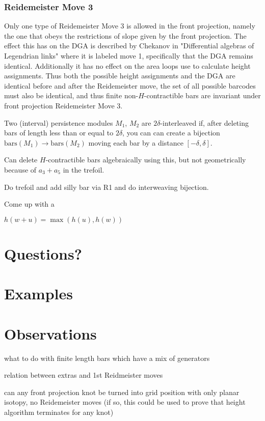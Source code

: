 \documentclass[11pt,oneside]{amsart}
\begin{document}
\subsubsection{Reidemeister Move 3} 

Only one type of Reidemeister Move 3 is allowed in the front projection, namely the one that obeys the restrictions of slope given by the front projection. The effect this has on the DGA is described by Chekanov in "Differential algebras of Legendrian links" where it is labeled move 1, specifically that the DGA remains identical. Additionally it has no effect on the area loops use to calculate height assignments. Thus both the possible height assignments and the DGA are identical before and after the Reidemeister move, the set of all possible barcodes must also be identical, and thus finite non-$H$-contractible bars are invariant under front projection Reidemeister Move 3.

\begin{definition}
    Two (interval) persistence modules $M_1$, $M_2$ are $2\delta$-interleaved if, after deleting bars of length less than or equal to $2\delta$, you can can create a bijection $\text{bars}(M_1)\rightarrow \text{bars}(M_2)$ moving each bar by a distance $[-\delta,\delta]$.
\end{definition}
Can delete $H$-contractible bars algebraically using this, but not geometrically because of $a_3 + a_5$ in the trefoil.

Do trefoil and add silly bar via R1 and do interweaving bijection.

Come up with a

$h(w+u)=\max(h(u),h(w))$
\section{Questions?}



\section{Examples}



\section{Observations}





what to do with finite length bars which have a mix of generators

relation between extras and 1st Reidmeister moves

can any front projection knot be turned into grid position with only planar isotopy, no Reidemeister moves (if so, this could be used to prove that height algorithm terminates for any knot)
\end{document}
